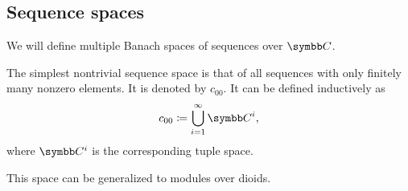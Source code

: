 \subsection{Sequence spaces}\label{subsec:sequence_spaces}

\begin{definition}\label{def:sequence_space}
  We will define multiple Banach spaces of sequences over \( \Co \).

  \begin{defenum}
     The simplest nontrivial sequence space is that of all sequences with only finitely many nonzero elements. It is denoted by \( c_{00} \). It can be defined inductively as
    \begin{equation*}
      c_{00} \coloneqq \bigcup_{i=1}^\infty \Co^i,
    \end{equation*}
    where \( \Co^i \) is the corresponding tuple space.

    This space can be generalized to modules over dioids.
  \end{defenum}
\end{definition}
